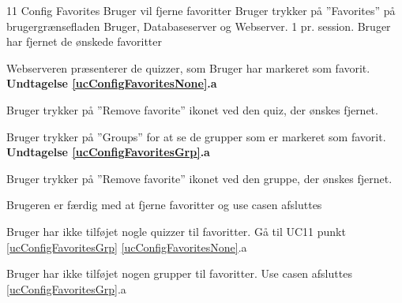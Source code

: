 
\uchead
	{11}
	{Config Favorites}
	{Bruger vil fjerne favoritter}
	{Bruger trykker på ''Favorites'' på brugergrænsefladen}
	{Bruger, Databaseserver og Webserver.}
	{}
	{1 pr. session.}
	{Bruger har fjernet de ønskede favoritter}

\item \label{ucConfigFavoritesNone} Webserveren præsenterer de  quizzer, som Bruger har markeret som favorit.
\textbf{Undtagelse \ref{ucConfigFavoritesNone}.a}

\item Bruger trykker på ''Remove favorite'' ikonet ved den quiz, der ønskes fjernet.

\item \label{ucConfigFavoritesGrp}Bruger trykker på ''Groups'' for at se de grupper som er markeret som favorit.
\textbf{Undtagelse \ref{ucConfigFavoritesGrp}.a}

\item Bruger trykker på ''Remove favorite'' ikonet ved den gruppe, der ønskes fjernet.

\item Brugeren er færdig med at fjerne favoritter og use casen afsluttes

\ucdescriptionend

\ucextension
	{Bruger har ikke tilføjet nogle quizzer til favoritter.}
	{Gå til UC11 punkt \ref{ucConfigFavoritesGrp}}
	{\ref{ucConfigFavoritesNone}.a}
		
\ucextension
			{Bruger har ikke tilføjet nogen grupper til favoritter.}
	{Use casen afsluttes}
	{\ref{ucConfigFavoritesGrp}.a}
	
		
